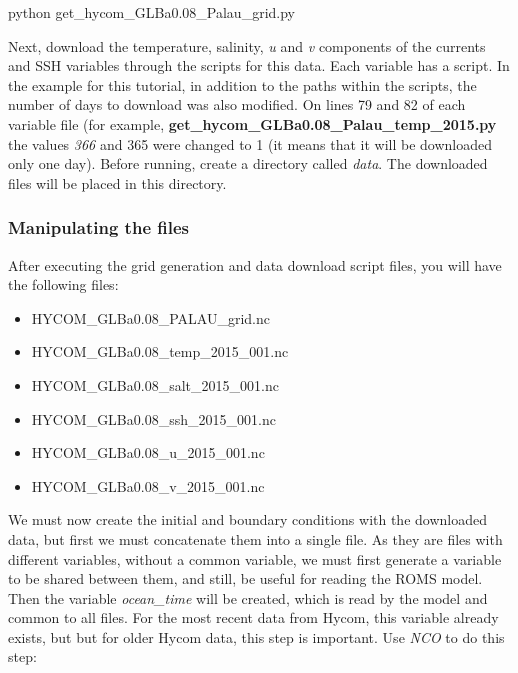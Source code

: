 \begin{bashcode}
python get_hycom_GLBa0.08_Palau_grid.py
\end{bashcode}
\bigskip

Next, download the temperature, salinity, \textit{u} and \textit{v} components of the currents and SSH variables 
through the scripts for this data. Each variable has a script. In the example for this tutorial, in addition to the paths within the scripts, the number of days 
to download was also modified. On lines 79 and 82 of each variable file (for example, \textbf{get\_hycom\_GLBa0.08\_Palau\_temp\_2015.py} the values \textit{366} and
365 were changed to 1 (it means that it will be downloaded only one day). Before running, create a directory called \textit{data}. The downloaded files will be placed in
this directory.
\bigskip

\subsubsection{Manipulating the files}
\bigskip

After executing the grid generation and data download script files, you will have the following files:
\bigskip

\begin{itemize}
    \item HYCOM\_GLBa0.08\_PALAU\_grid.nc
    \item HYCOM\_GLBa0.08\_temp\_2015\_001.nc
    \item HYCOM\_GLBa0.08\_salt\_2015\_001.nc
    \item HYCOM\_GLBa0.08\_ssh\_2015\_001.nc   
    \item HYCOM\_GLBa0.08\_u\_2015\_001.nc
    \item HYCOM\_GLBa0.08\_v\_2015\_001.nc    
\end{itemize}
\bigskip

We must now create the initial and boundary conditions with the downloaded data, but first we must concatenate them into a single file. 
As they are files with different variables, without a common variable, we must first generate a variable to be shared between them, and still, be useful 
for reading the ROMS model. Then the variable \textit{ocean\_time} will be created, which is read by the model and common to all files.
For the most recent data from Hycom, this variable already exists, but but for older Hycom data, this step is important. Use \textit{NCO} to do this step:
\bigskip

